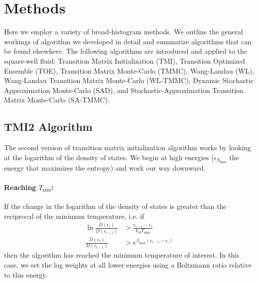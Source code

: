 \documentclass[letterpaper,twocolumn,amsmath,amssymb,pre,aps,10pt]{revtex4-1}
\begin{document}
\section{Methods}

Here we employ a variety of broad-histogram methods.  We outline the
general workings of algorithm we developed in detail and summarize
algorithms that can be found elsewhere.  The following algorithms are
introduced and applied to the square-well fluid: Transition Matrix
Initialization (TMI), Transition Optimized Ensemble (TOE), Transition
Matrix Monte-Carlo (TMMC), Wang-Landau (WL), Wang-Landau Transition
Matrix Monte-Carlo (WL-TMMC), Dynamic Stochastic Approximation
Monte-Carlo (SAD), and Stochastic-Approximation Transition Matrix
Monte-Carlo (SA-TMMC).

\subsection{TMI2 Algorithm}

The second version of transition matrix initialization algorithm works
by looking at the logarithm of the density of states.  We begin at
high energies ($\epsilon_{S_{\max}}$ the energy that maximizes the entropy) and work our way
downward.

\paragraph{Reaching $T_{\min}$:}
If the change in the logarithm of the density of states is greater
than the reciprocal of the minimum temperature, i.e. if
\begin{align}
  \ln\frac{D(\epsilon_i)}{D(\epsilon_{i-1})} &>
  \frac{\epsilon_{i-1} - \epsilon_i}{k_BT_{\min}}
  \\
  \frac{D(\epsilon_i)}{D(\epsilon_{i-1})} &>
  e^{\beta_{\max}(\epsilon_{i-1} - \epsilon_i)}
\end{align}
then the algorithm has reached the minimum temperature of interest.
In this case, we set the log weights at all lower energies using a
Boltzmann ratio relative to this energy.
\end{document}
